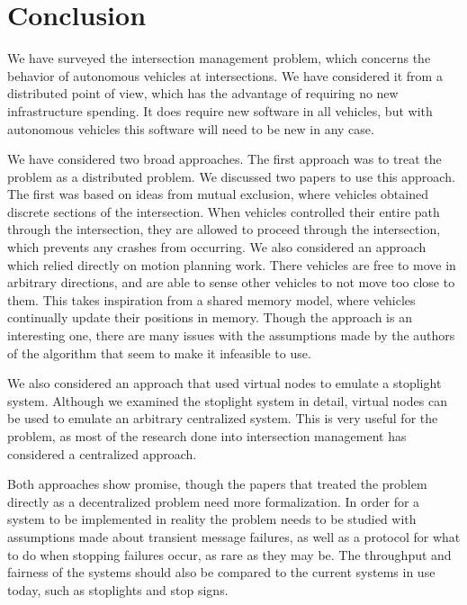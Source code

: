 \documentclass[12pt]{article}
\begin{document}
\section{Conclusion}
We have surveyed the intersection management problem, which concerns the behavior of autonomous vehicles at intersections. We have considered it from a distributed point of view, which has the advantage of requiring no new infrastructure spending. It does require new software in all vehicles, but with autonomous vehicles this software will need to be new in any case.\par
We have considered two broad approaches. The first approach was to treat the problem as a distributed problem. We discussed two papers to use this approach. The first was based on ideas from mutual exclusion, where vehicles obtained discrete sections of the intersection. When vehicles controlled their entire path through the intersection, they are allowed to proceed through the intersection, which prevents any crashes from occurring. We also considered an approach which relied directly on motion planning work. There vehicles are free to move in arbitrary directions, and are able to sense other vehicles to not move too close to them. This takes inspiration from a shared memory model, where vehicles continually update their positions in memory. Though the approach is an interesting one, there are many issues with the assumptions made by the authors of the algorithm that seem to make it infeasible to use.\par
We also considered an approach that used virtual nodes to emulate a stoplight system. Although we examined the stoplight system in detail, virtual nodes can be used to emulate an arbitrary centralized system. This is very useful for the problem, as most of the research done into intersection management has considered a centralized approach.\par
Both approaches show promise, though the papers that treated the problem directly as a decentralized problem need more formalization. In order for a system to be implemented in reality the problem needs to be studied with assumptions made about transient message failures, as well as a protocol for what to do when stopping failures occur, as rare as they may be. The throughput and fairness of the systems should also be compared to the current systems in use today, such as stoplights and stop signs.

\label{sec:conclusion}

\pagebreak
\end{document}
